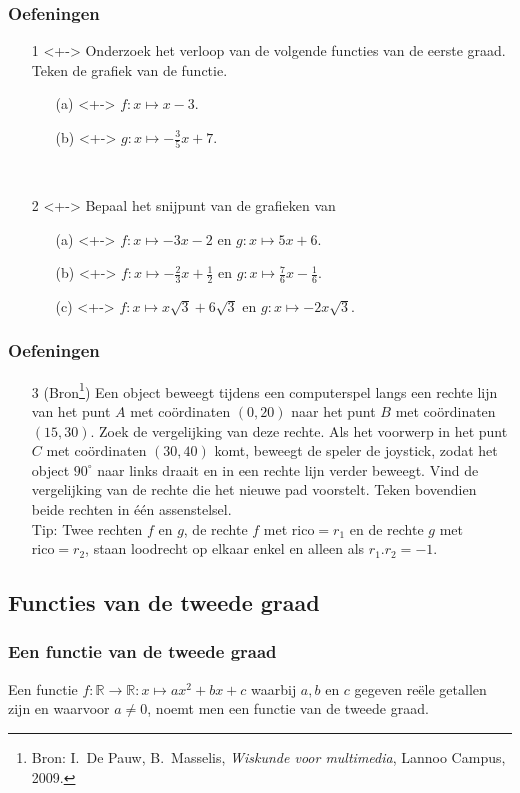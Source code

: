 \begin{frame}
\frametitle{Oefeningen}
\pause
\begin{enumerate}
\item[1]<+-> Onderzoek het verloop van de volgende functies van de eerste graad. Teken de grafiek van de functie.
      \begin{enumerate}
      \item[(a)]<+-> $f:x\mapsto x-3$.
      \item[(b)]<+-> $g:x\mapsto -\frac{3}{5}x+7$.
      \end{enumerate}~\\
\item[2]<+-> Bepaal het snijpunt van de grafieken van 
      \begin{enumerate}
      \item[(a)]<+-> $f:x\mapsto -3x-2$ en $g:x\mapsto 5x+6$.
      \item[(b)]<+-> $f:x\mapsto -\frac{2}{3}x+\frac{1}{2}$ en $g:x\mapsto \frac{7}{6}x-\frac{1}{6}$.
      \item[(c)]<+-> $f:x\mapsto x\sqrt{3}+6\sqrt{3}$ en $g:x\mapsto -2x\sqrt{3}$.
      \end{enumerate}
\end{enumerate}
\end{frame}

\begin{frame}
\frametitle{Oefeningen}
\begin{enumerate}
\item[3] (Bron\footnote{Bron: I.\ De Pauw, B.\ Masselis, {\em Wiskunde voor multimedia}, Lannoo Campus, 2009.}) Een object beweegt tijdens een computerspel langs een rechte lijn van het punt $A$ met co\"ordinaten $(0,20)$ naar het punt $B$
met co\"ordinaten $(15,30)$. Zoek de vergelijking van deze rechte. Als het voorwerp in het punt $C$ met co\"ordinaten $(30,40)$ komt, beweegt de speler de joystick, zodat het object $90^\circ$ naar links draait en in een rechte lijn verder beweegt. Vind de vergelijking van de rechte die het nieuwe pad voorstelt. Teken bovendien beide rechten in \'e\'en assenstelsel.\\
Tip: Twee rechten $f$ en $g$, de rechte $f$ met $\mbox{rico} = r_1$ en de rechte $g$ met $\mbox{rico} = r_2$, staan loodrecht op elkaar enkel en alleen als $r_1.r_2=-1$. \\
\end{enumerate}
\end{frame}

\subsection{Functies van de tweede graad}
\begin{frame}
\frametitle{Een functie van de tweede graad}
\pause
\begin{definitie}
Een functie $f:\mathbb{R}\rightarrow \mathbb{R}:x\mapsto ax^2+bx+c$ waarbij $a,b$ en $c$ gegeven re\"ele getallen zijn en waarvoor $a\neq 0$, noemt men een functie van de tweede graad.
\end{definitie}
\end{frame}

